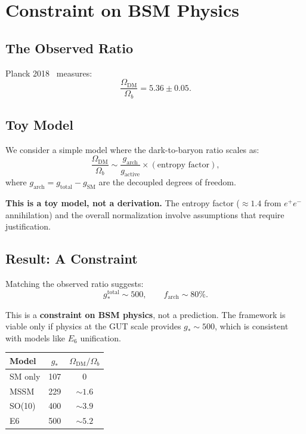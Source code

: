\documentclass[11pt,a4paper]{article}
\begin{document}
\section{Constraint on BSM Physics}

\subsection{The Observed Ratio}

Planck 2018~\citep{Planck2018} measures:
\begin{equation}
\frac{\Omega_{\mathrm{DM}}}{\Omega_b} = 5.36 \pm 0.05.
\end{equation}

\subsection{Toy Model}

We consider a simple model where the dark-to-baryon ratio scales as:
\begin{equation}
\frac{\Omega_{\mathrm{DM}}}{\Omega_b} \sim \frac{g_{\mathrm{arch}}}{g_{\mathrm{active}}} \times (\text{entropy factor}),
\end{equation}
where $g_{\mathrm{arch}} = g_{\mathrm{total}} - g_{\mathrm{SM}}$ are the decoupled degrees of freedom.

\textbf{This is a toy model, not a derivation.} The entropy factor ($\approx 1.4$ from $e^+e^-$ annihilation) and the overall normalization involve assumptions that require justification.

\subsection{Result: A Constraint}

Matching the observed ratio suggests:
\begin{equation}
g_*^{\mathrm{total}} \sim 500, \qquad f_{\mathrm{arch}} \sim 80\%.
\end{equation}

This is a \textbf{constraint on BSM physics}, not a prediction. The framework is viable only if physics at the GUT scale provides $g_* \sim 500$, which is consistent with models like $E_6$ unification.

\begin{center}
\begin{tabular}{lcc}
\toprule
Model & $g_*$ & $\Omega_{\mathrm{DM}}/\Omega_b$ \\
\midrule
SM only & 107 & 0 \\
MSSM & 229 & $\sim 1.6$ \\
SO(10) & 400 & $\sim 3.9$ \\
E6 & 500 & $\sim 5.2$ \\
\bottomrule
\end{tabular}
\end{center}
\end{document}
